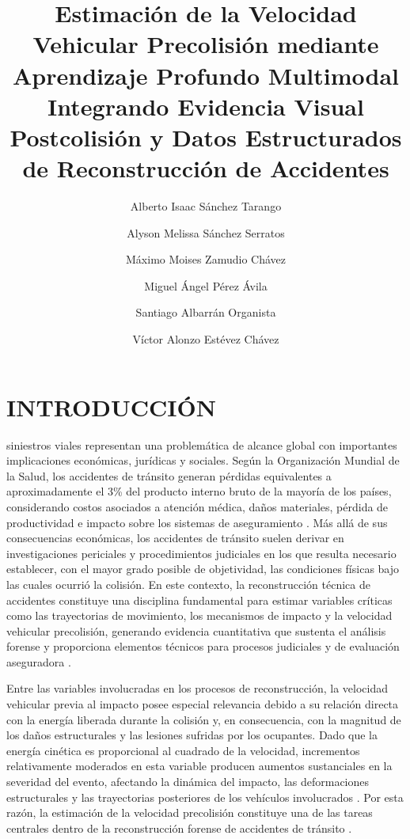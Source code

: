 \documentclass[esp]{SpeedEstimationAI_paper}
\title{Estimación de la Velocidad Vehicular Precolisión mediante Aprendizaje Profundo Multimodal Integrando Evidencia Visual Postcolisión y Datos Estructurados de Reconstrucción de Accidentes}
\author[1]{Alberto Isaac Sánchez Tarango}
\author[1]{Alyson Melissa Sánchez Serratos}
\author[1]{Máximo Moises Zamudio Chávez}
\author[1]{Miguel Ángel Pérez Ávila}
\author[1]{Santiago Albarrán Organista}
\author[1]{Víctor Alonzo Estévez Chávez}
\affil[1]{Tecnológico de Monterrey, Escuela de Ingeniería y Ciencias, Campus Toluca, Estado de México, México}
\begin{document}
\maketitle
\thispagestyle{fancy}
\printcontactdata

\section{INTRODUCCIÓN}

 siniestros viales representan una problemática de alcance global con importantes implicaciones económicas, jurídicas y sociales. Según la Organización Mundial de la Salud, los accidentes de tránsito generan pérdidas equivalentes a aproximadamente el 3\% del producto interno bruto de la mayoría de los países, considerando costos asociados a atención médica, daños materiales, pérdida de productividad e impacto sobre los sistemas de aseguramiento \cite{WHO2023}. Más allá de sus consecuencias económicas, los accidentes de tránsito suelen derivar en investigaciones periciales y procedimientos judiciales en los que resulta necesario establecer, con el mayor grado posible de objetividad, las condiciones físicas bajo las cuales ocurrió la colisión. En este contexto, la reconstrucción técnica de accidentes constituye una disciplina fundamental para estimar variables críticas como las trayectorias de movimiento, los mecanismos de impacto y la velocidad vehicular precolisión, generando evidencia cuantitativa que sustenta el análisis forense y proporciona elementos técnicos para procesos judiciales y de evaluación aseguradora \cite{Brach2011,Fricke1990}.

Entre las variables involucradas en los procesos de reconstrucción, la velocidad vehicular previa al impacto posee especial relevancia debido a su relación directa con la energía liberada durante la colisión y, en consecuencia, con la magnitud de los daños estructurales y las lesiones sufridas por los ocupantes. Dado que la energía cinética es proporcional al cuadrado de la velocidad, incrementos relativamente moderados en esta variable producen aumentos sustanciales en la severidad del evento, afectando la dinámica del impacto, las deformaciones estructurales y las trayectorias posteriores de los vehículos involucrados \cite{Fricke1990}. Por esta razón, la estimación de la velocidad precolisión constituye una de las tareas centrales dentro de la reconstrucción forense de accidentes de tránsito \cite{Struble2014}.
\end{document}
